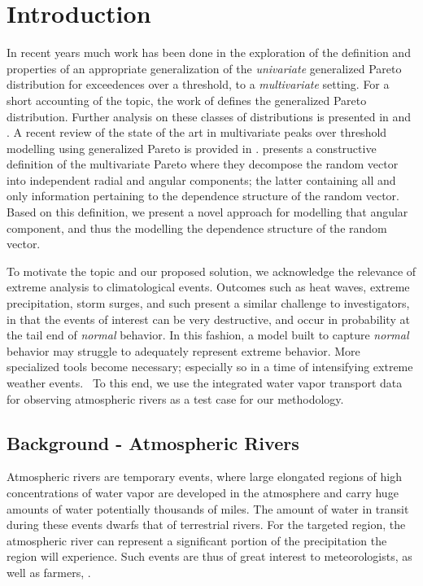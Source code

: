 
\section{Introduction}
In recent years much work has been done in the exploration of the definition and properties of an
  appropriate generalization of the \emph{univariate} generalized Pareto distribution for exceedences over a
  threshold, to a \emph{multivariate} setting.  For a short accounting of the topic, the work of
  \cite{rootzen2006} defines the generalized Pareto distribution.  Further analysis on these classes
  of distributions is presented in \cite{falk2008} and \cite{michel2008}.  A recent review of the state
  of the art in multivariate peaks over threshold modelling using generalized Pareto is provided in
  \cite{rootzen2018}.  \cite{ferreira2014} presents a constructive definition of the multivariate Pareto
  where they decompose the random vector into independent radial and angular components; the latter
  containing all and only information pertaining to the dependence structure of the random vector.
  Based on this definition, we present a novel approach for modelling that angular component, and thus
  the modelling the dependence structure of the random vector.

To motivate the topic and our proposed solution, we acknowledge the relevance of extreme analysis to
  climatological events.  Outcomes such as heat waves, extreme precipitation, storm surges, and
  such present a similar challenge to investigators, in that the events of interest can be very destructive,
  and occur in probability at the tail end of \emph{normal} behavior.  In this fashion, a model built
  to capture \emph{normal} behavior may struggle to adequately represent extreme behavior.  More
  specialized tools become necessary; especially so in a time of intensifying extreme weather
  events.~\cite{jentsch2007,vousdoukas2018,li2019}  To this end, we use the integrated water vapor
  transport data for observing atmospheric rivers as a test case for our methodology.

\subsection{Background - Atmospheric Rivers}
Atmospheric rivers are temporary events, where large elongated regions of high concentrations of
  water vapor are developed in the atmosphere and carry huge amounts of water potentially thousands
  of miles.  The amount of water in transit during these events dwarfs that of terrestrial rivers.
  For the targeted region, the atmospheric river can represent a significant portion of the
  precipitation the region will experience.  Such events are thus of great interest to meteorologists,
  as well as farmers, .

